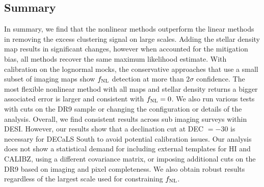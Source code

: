\subsection{Summary}
In summary, we find that the nonlinear methods outperform the linear methods in removing the excess clustering signal on large scales. Adding the stellar density map results in significant changes, however when accounted for the mitigation bias, all methods recover the same maximum likelihood estimate. With calibration on the lognormal mocks, the conservative approaches that use a small subset of imaging maps show $f_{\rm NL}$ detection at more than $2\sigma$ confidence. The most flexible nonlinear method with all maps and stellar density returns a bigger associated error is larger and consistent with $f_{\rm NL}=0$. We also run various tests with cuts on the DR9 sample or changing the configuration or details of the analysis. Overall, we find consistent results across sub imaging surveys within DESI. However, our results show that a declination cut at DEC $=-30$ is necessary for DECaLS South to avoid potential calibration issues. Our analysis does not show a statistical demand for including external templates for HI and CALIBZ, using a different covariance matrix, or imposing additional cuts on the DR9 based on imaging and pixel completeness. We also obtain robust results regardless of the largest scale used for constraining $f_{\rm NL}$.